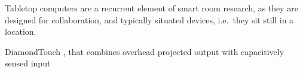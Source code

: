 Tabletop computers are a recurrent element of smart room research, as they are designed for collaboration, and typically situated devices, i.e.\ they sit still in a location.

DiamondTouch \citep{Dietz:2001:diamondtouch}, that combines overhead projected output with capacitively sensed input



